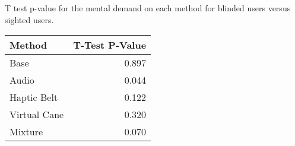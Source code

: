 
\centering
\caption{T test p-value for the mental demand on each method for blinded users versus sighted users.}
\label{tab:ttest_mental_demand}
\begin{tabular}{lr}
\toprule
      Method &  T-Test P-Value \\
\midrule
        Base &           0.897 \\
       Audio &           0.044 \\
 Haptic Belt &           0.122 \\
Virtual Cane &           0.320 \\
     Mixture &           0.070 \\
\bottomrule
\end{tabular}
